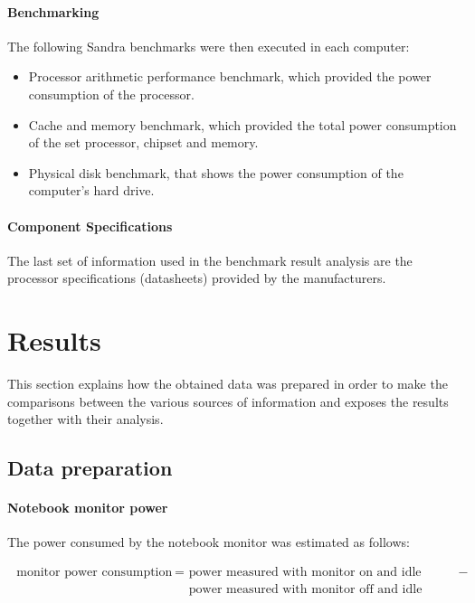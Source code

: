             
        \paragraph*{Benchmarking}
            The following Sandra benchmarks were then executed in each computer:
            \begin{itemize}
                \item Processor arithmetic performance benchmark, which provided the power consumption of the processor.
                \item Cache and memory benchmark, which provided the total power consumption of the set processor, chipset and memory.
                \item Physical disk benchmark, that shows the power consumption of the computer's hard drive.
            \end{itemize}
            
            
        \paragraph*{Component Specifications}
            The last set of information used in the benchmark result analysis are the processor specifications (datasheets) provided by the manufacturers.      
                        
            
\section{Results} \label{sec4:results}
This section explains how the obtained data was prepared in order to make the comparisons between the various sources of information and exposes the results together with their analysis.

    \subsection{Data preparation} \label{sec4:data_preparation}

        \paragraph*{Notebook monitor power}
        
            The power consumed by the notebook monitor was estimated as follows: 
            
            \begin{equation}
                \begin{split}
                    \text{ monitor power consumption } =& \text{ power measured with monitor on and idle processor } -  \\
                    & \text{ power measured with monitor off and idle processor }  
                \end{split}
                \label{eq:monitor_consumption}
            \end{equation}
            
